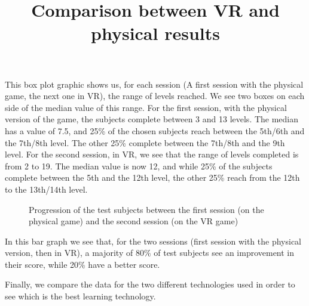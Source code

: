 \documentclass[12pt, openany, twocolumn]{article}
\begin{document}
            This box plot graphic shows us, for each session (A first session with the physical game, the next one in VR), the range of levels reached. We see two boxes on each side of the median value of this range.
            For the first session, with the physical version of the game, the subjects complete between 3 and 13 levels. The median has a value of 7.5, and 25\% of the chosen subjects reach between the 5th/6th and the 7th/8th level. The other 25\% complete between the 7th/8th and the 9th level.
            For the second session, in VR, we see that the range of levels completed is from 2 to 19. The median value is now 12, and while 25\% of the subjects complete between the 5th and the 12th level, the other 25\% reach from the 12th to the 13th/14th level.

                \begin{figure}[H]
                    \setlength{\fboxsep}{0pt}
                    \setlength{\fboxrule}{1pt}
                    \caption{Progression of the test subjects between the first session (on the physical game) and the second session (on the VR game)}
                \end{figure}

            In this bar graph we see that, for the two sessions (first session with the physical version, then in VR), a majority of 80\% of test subjects see an improvement in their score, while 20\% have a better score.
            \\

            \noindent \title{\textbf{Comparison between VR and physical results}} \vspace{0.25cm}

            \noindent Finally, we compare the data for the two different technologies used in order to see which is the best learning technology. \\
\end{document}
